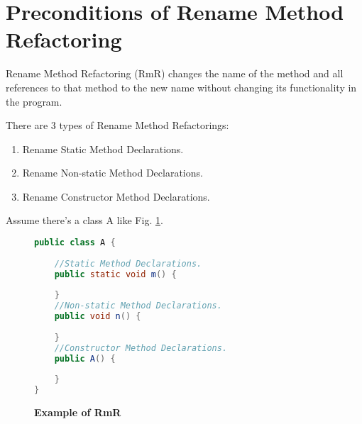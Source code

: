 \section{\textbf{Preconditions of Rename Method Refactoring}}

Rename Method Refactoring (RmR) changes the name of the method and all references to that method to the new name without changing its functionality in the program.

There are 3 types of Rename Method Refactorings:
\begin{enumerate}
\item Rename Static Method Declarations.
\item Rename Non-static Method Declarations.
\item Rename Constructor Method Declarations.
\end{enumerate}

Assume there's a class A like Fig. \ref{fig:RmR}.

\begin{figure}[th]
\centering
\begin{minipage}[t]{0.45\linewidth}
\begin{lstlisting}[language=java, basicstyle=\scriptsize\ttfamily,frame=single]
public class A {
    
	//Static Method Declarations.
	public static void m() {
		
	}
	//Non-static Method Declarations.
	public void n() {
		
	}
	//Constructor Method Declarations.
	public A() {
		
	}
}
\end{lstlisting}
\end{minipage}
\hfill

\caption{\textbf{Example of RmR}}
\label{fig:RmR}
\end{figure}